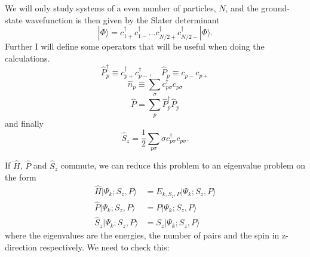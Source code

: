 \documentclass[norsk,a4paper,12pt]{article}
\begin{document}
We will only study systems of a even number of particles, $N$, and the ground-state wavefunction is then given by the Slater determinant
\begin{equation}
|\Phi\rangle=c_{1+}^{\dagger}c_{1-}^{\dagger}\hdots c_{N/2 +}^{\dagger}c_{N/2 -}^{\dagger}|\Phi\rangle.
\end{equation}
Further I will define some operators that will be useful when doing the calculations. 
\begin{equation}
\hat{P}_p^{\dagger}\equiv c_{p+}^{\dagger}c_{p-}^{\dagger},\quad \hat{P}_p\equiv c_{p-}c_{p+}
\end{equation}
\begin{equation}
\hat{n}_p\equiv\sum_{\sigma}c_{p\sigma}^{\dagger}c_{p\sigma}
\end{equation}
\begin{equation}
\hat{P}=\sum_p\hat{P}_p^{\dagger}\hat{P}_p
\end{equation}
and finally
\begin{equation}
\hat{S}_z=\frac{1}{2}\sum_{p\sigma}\sigma c_{p\sigma}^{\dagger}c_{p\sigma}.
\end{equation}

If $\hat{H}$, $\hat{P}$ and $\hat{S}_z$ commute, we can reduce this problem to an eigenvalue problem on the form
\begin{align*}
\hat{H}|\Psi_k;S_z,P\rangle&=E_{k,S_z,P}|\Psi_k;S_z,P\rangle\\
\hat{P}|\Psi_k;S_z,P\rangle&=P|\Psi_k;S_z,P\rangle\\
\hat{S}_z|\Psi_k;S_z,P\rangle&=S_z|\Psi_k;S_z,P\rangle
\end{align*}
where the eigenvalues are the energies, the number of pairs and the spin in z-direction respectively. We need to check this:
\end{document}

